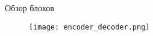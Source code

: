 
\begin{frame}{Обзор блоков}
\begin{figure}
\centering
\texttt{[image: encoder\_decoder.png]}
\end{figure}
\end{frame}